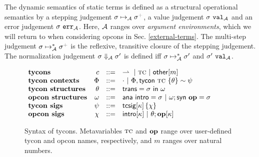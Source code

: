 \documentclass[10pt,preprint]{sigplanconf}
\newcommand{\moutput}{^{\color{gray}+}}
\begin{document}
The dynamic semantics of static terms is defined as a structural operational semantics by a stepping judgement $\sstep{\st}{\argEnv}{\st\moutput}$, a value judgement $\sigma~\mathtt{val}_{\mathcal{A}}$ and an error judgement $\sigma~\mathtt{err}_{\mathcal{A}}$. Here, $\mathcal{A}$ ranges over \emph{argument environments}, which we will  return to when considering opcons in Sec. \ref{external-terms}. The multi-step judgement $\smanystep{\st}{\argEnv}{\st\moutput}$ is the reflexive, transitive closure of the stepping judgement. The normalization judgement $\sigma \Downarrow_{\mathcal{A}} \sigma'$ is defined iff $\sigma \mapsto_{\mathcal{A}}^{*} \sigma'$ and $\sigma'~\mathtt{val}_{\mathcal{A}}$. %
\begin{figure}[t]
\small
$\begin{array}{lrcl}
\textbf{tycons} & c & ::= & \rightharpoonup ~|~ \textsc{tc} ~|~ {\sf other}[m]\\
\textbf{tycon contexts} & \Phi & ::= & \cdot ~|~ \Phi, {\sf tycon}~\textsc{tc} ~\{\theta\} \sim \psi\\
\textbf{tycon structures} & \theta & ::= & {\sf trans}=\sigma~{\sf in}~\omega \\
\textbf{opcon structures} & \omega & ::= & {\sf ana}~{\sf intro}=\sigma ~|~ \omega; {\sf syn}~\textbf{op}=\sigma\\
\textbf{tycon sigs} & \psi & ::= & {\sf tcsig}[\kappa]\,\{\chi\}\\
\textbf{opcon sigs}& \chi & ::= & {\sf intro}[\kappa] ~|~ \theta; \textbf{op}[\kappa]\\
\end{array}$
\caption{Syntax of tycons. Metavariables $\textsc{tc}$ and $\textbf{op}$ range over user-defined tycon and opcon names, respectively, and $m$ ranges over natural numbers.}
\label{syntax-TC}\vspace{-5px}
\end{figure}
\end{document}
